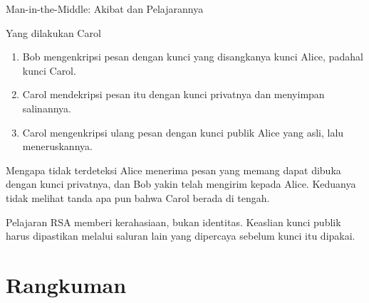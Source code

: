\documentclass[aspectratio=169,11pt]{beamer}
\begin{document}
\begin{frame}{Man-in-the-Middle: Akibat dan Pelajarannya}
    \footnotesize
    \begin{block}{Yang dilakukan Carol}
        \begin{enumerate}
            \item Bob mengenkripsi pesan dengan kunci yang disangkanya kunci
                  Alice, padahal kunci Carol.
            \item Carol mendekripsi pesan itu dengan kunci privatnya dan
                  menyimpan salinannya.
            \item Carol mengenkripsi ulang pesan dengan kunci publik Alice
                  yang asli, lalu meneruskannya.
        \end{enumerate}
    \end{block}
    \begin{alertblock}{Mengapa tidak terdeteksi}
        \footnotesize
        Alice menerima pesan yang memang dapat dibuka dengan kunci
        privatnya, dan Bob yakin telah mengirim kepada Alice. Keduanya tidak
        melihat tanda apa pun bahwa Carol berada di tengah.
    \end{alertblock}
    \begin{exampleblock}{Pelajaran}
        \footnotesize
        RSA memberi kerahasiaan, bukan identitas. Keaslian kunci publik
        harus dipastikan melalui saluran lain yang dipercaya sebelum kunci
        itu dipakai.
    \end{exampleblock}
\end{frame}

\section{Rangkuman}
\end{document}

